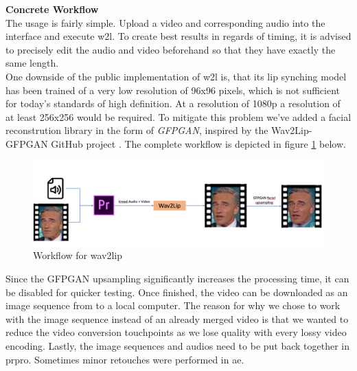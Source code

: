 \documentclass[
  a4paper,  %
  twoside,  %
  bibliography=totoc,
  headsepline,
  cleardoublepage=empty,
  parskip=half,
  draft=false
]{scrbook}
\begin{document}
\textbf{Concrete Workflow} \\
The usage is fairly simple. Upload a video and corresponding audio into the interface and execute \gls{w2l}. To create best results in regards of timing, it is advised to precisely edit the audio and video beforehand so that they have exactly the same length. \\
One downside of the public implementation of \gls{w2l} is, that its lip synching model has been trained of a very low resolution of 96x96 pixels, which is not sufficient for today's standards of high definition. At a resolution of 1080p a resolution of at least 256x256 would be required. To mitigate this problem we've added a facial reconstrution library in the form of \textit{GFPGAN}, inspired by the Wav2Lip-GFPGAN GitHub project \cite{sainyAjaysainyWav2LipGFPGAN2023}.
The complete workflow is depicted in figure \ref{fig:w2l workflow} below.
\begin{figure}[h]
  \centering
  \includegraphics[width=1\textwidth]{./graphics/images/wav2lip/w2l workflow.png}
  \caption{Workflow for wav2lip}
  \label{fig:w2l workflow}
\end{figure}
Since the GFPGAN upsampling significantly increases the processing time, it can be disabled for quicker testing. Once finished, the video can be downloaded as an image sequence from to a local computer. The reason for why we chose to work with the image sequence instead of an already merged video is that we wanted to reduce the video conversion touchpoints as we lose quality with every lossy video encoding. Lastly, the image sequences and audios need to be put back together in \gls{prpro}. Sometimes minor retouches were performed in \gls{ae}.
\end{document}
